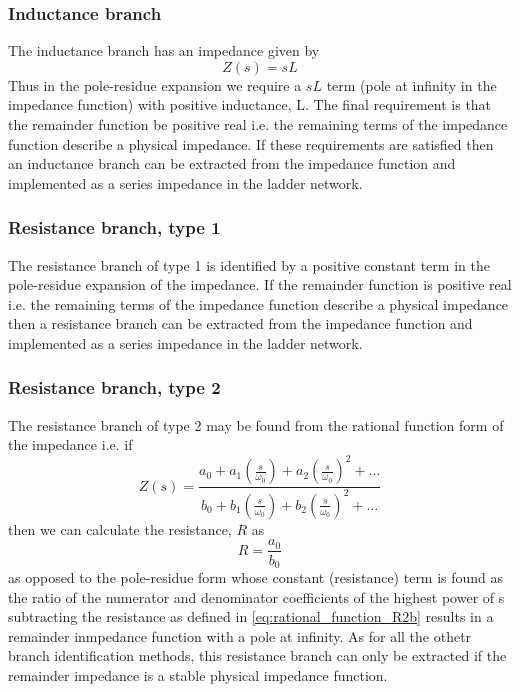 \subsubsection{Inductance branch}

The inductance branch has an impedance given by
\begin{equation} 
Z\left(s\right)=sL
\end{equation}
Thus in the pole-residue expansion we require a $sL$ term (pole at infinity in the impedance function) with positive inductance, L.
The final requirement is that the remainder function be positive real i.e. the remaining terms of the impedance function describe a physical impedance. If these requirements are satisfied then an inductance branch can be extracted from the impedance function and implemented as a series impedance in the ladder network. 

\subsubsection{Resistance branch, type 1}

The resistance branch of type 1 is identified by a positive constant term in the pole-residue expansion of the impedance. If the remainder function is positive real i.e. the remaining terms of the impedance function describe a physical impedance then a resistance branch can be extracted from the impedance function and implemented as a series impedance in the ladder network. 

\subsubsection{Resistance branch, type 2}

The resistance branch of type 2 may be found from the rational function form of the impedance i.e. if
%
\begin{equation} \label{eq:rational_function_R2}
Z\left(s\right)=\frac{a_{0}+a_{1}\left(\frac{s}{\omega_{0}}\right)+a_{2}\left(\frac{s}{\omega_{0}}\right)^{2}+\dots}{b_{0}+b_{1}\left(\frac{s}{\omega_{0}}\right)+b_{2}\left(\frac{s}{\omega_{0}}\right)^{2}+\dots}
\end{equation}
%
then we can calculate the resistance, $R$ as
%
\begin{equation} \label{eq:rational_function_R2b}
R=\frac{a_{0}}{b_{0}}
\end{equation}
%
as opposed to the pole-residue form whose constant (resistance) term is found as the ratio of the numerator and denominator coefficients of the highest power of s 
%
subtracting the resistance as defined in \ref{eq:rational_function_R2b} results in a remainder inmpedance function with a pole at infinity. As for all the othetr branch identification methods, this resistance branch can only be extracted if the remainder impedance is a stable physical impedance function. 


